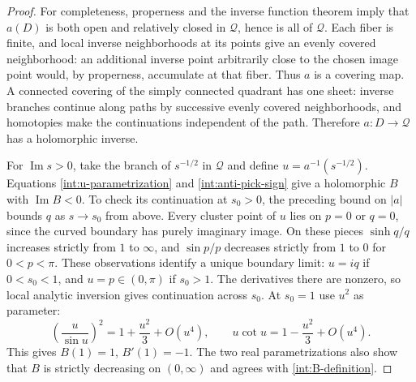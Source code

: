 \begin{proof}
For completeness, properness and the inverse function theorem imply
that $a(D)$ is both open and relatively closed in $\mathcal Q$, hence
is all of $\mathcal Q$.  Each fiber is finite, and local inverse
neighborhoods at its points give an evenly covered neighborhood: an
additional inverse point arbitrarily close to the chosen image point
would, by properness, accumulate at that fiber.  Thus $a$ is a covering
map.  A connected covering of the simply connected quadrant has one
sheet: inverse branches continue along paths by successive evenly
covered neighborhoods, and homotopies make the continuations
independent of the path.  Therefore $a:D\to\mathcal Q$ has a
holomorphic inverse.

For $\operatorname{Im}s>0$, take the branch of $s^{-1/2}$ in
$\mathcal Q$ and define $u=a^{-1}(s^{-1/2})$.  Equations
\eqref{int:u-parametrization} and \eqref{int:anti-pick-sign} give a
holomorphic $B$ with $\operatorname{Im}B<0$.
To check its continuation at $s_0>0$, the preceding bound on $|a|$
bounds $q$ as $s\to s_0$ from above.  Every cluster point of $u$ lies
on $p=0$ or $q=0$, since the curved boundary has purely imaginary
image.  On these pieces $\sinh q/q$ increases strictly from $1$ to
$\infty$, and $\sin p/p$ decreases strictly from $1$ to $0$ for
$0<p<\pi$.  These observations identify a unique boundary limit:
$u=iq$ if $0<s_0<1$, and $u=p\in(0,\pi)$ if $s_0>1$.
The derivatives there are nonzero, so local analytic inversion gives
continuation across $s_0$.  At $s_0=1$ use $u^2$ as parameter:
\[
 \left(\frac{u}{\sin u}\right)^2=1+\frac{u^2}{3}+O(u^4),
 \qquad u\cot u=1-\frac{u^2}{3}+O(u^4).
\]
This gives $B(1)=1$, $B'(1)=-1$.  The two real parametrizations
also show that $B$ is strictly decreasing on $(0,\infty)$ and agrees
with \eqref{int:B-definition}.


\end{proof}

